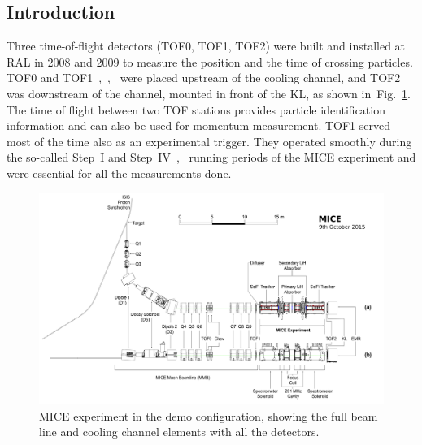 
\subsection{Introduction}
\label{SubSect:TOF_Intro}

Three time-of-flight detectors (TOF0, TOF1, TOF2) were built and
installed at RAL in 2008 and 2009 to measure the position and the time
of crossing particles.  TOF0 and
TOF1~\cite{NOTE145},~\cite{NOTE241},~\cite{2010NIMPA.615...14B} were
placed upstream of the cooling channel, and TOF2~\cite{NOTE286} was
downstream of the channel, mounted in front of the KL, as shown
in~Fig.~\ref{fig:BL}.  The time of flight between two TOF stations
provides particle identification information and can also be used for
momentum measurement. TOF1 served most of the time also as an
experimental trigger. They operated smoothly during the so-called
Step~I and Step~IV~\cite{Rajaram:2015bra},~\cite{2015ehep.confE.521B}
running periods of the MICE experiment and were essential for all the
measurements done.

\begin{figure}[!ht]
  \begin{center}
    \includegraphics[width=0.8\columnwidth]{BL.png}
    \caption{MICE experiment in the demo configuration, showing the full beam line and cooling channel elements with all the detectors.}
    \label{fig:BL}
  \end{center}
\end{figure}

